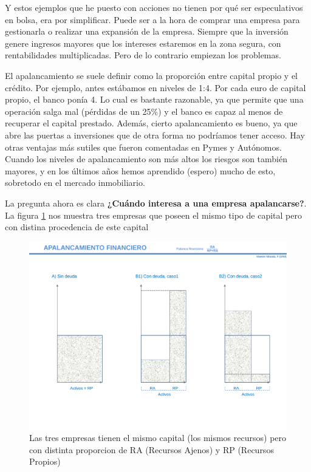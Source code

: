 \documentclass[nochap,palatino,shortheader]{apuntes}
\begin{document}
Y estos ejemplos que he puesto con acciones no tienen por qué ser especulativos en bolsa, era por simplificar. Puede ser a la hora de comprar una empresa para gestionarla o realizar una expansión de la empresa. Siempre que la inversión genere ingresos mayores que los intereses estaremos en la zona segura, con rentabilidades multiplicadas. Pero de lo contrario empiezan los problemas.

El apalancamiento se suele definir como la proporción entre capital propio y el crédito. Por ejemplo, antes estábamos en niveles de 1:4. Por cada euro de capital propio, el banco ponía 4. Lo cual es bastante razonable, ya que permite que una operación salga mal (pérdidas de un 25\%) y el banco es capaz al menos de recuperar el capital prestado. Además, cierto apalancamiento es bueno, ya que abre las puertas a inversiones que de otra forma no podríamos tener acceso. Hay otras ventajas más sutiles que fueron comentadas en Pymes y Autónomos. Cuando los niveles de apalancamiento son más altos los riesgos son también mayores, y en los últimos años hemos aprendido (espero) mucho de esto, sobretodo en el mercado inmobiliario.

La pregunta ahora es clara \textbf{¿Cuándo interesa a una empresa apalancarse?}. La figura \ref{fig:ApalancamientoFinanciero} nos muestra tres empresas que poseen el mismo tipo de capital pero con distina procedencia de este capital

\begin{figure}[hbtp]
\centering
\includegraphics[width=\textwidth]{img/apalancamiento.png}
\caption{Las tres empresas tienen el mismo capital (los mismos recursos) pero con distinta proporcion de RA (Recursos Ajenos) y RP (Recursos Propios)}
\label{fig:ApalancamientoFinanciero}
\end{figure}
\end{document}
